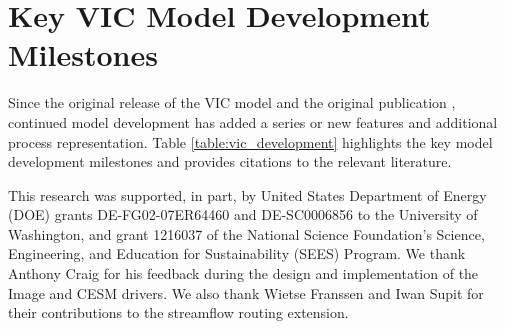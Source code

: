 \documentclass[gmd, manuscript]{copernicus}
\begin{document}
\appendix
\section{Key VIC Model Development Milestones}
\label{appendix:model_development}

Since the original release of the VIC model and the original publication \citet{Liang_1994}, continued model development has added a series or new features and additional process representation. Table \ref{table:vic_development} highlights the key model development milestones and provides citations to the relevant literature.


\begin{acknowledgements}
  This research was supported, in part, by United States Department of Energy (DOE) grants DE-FG02-07ER64460 and DE-SC0006856 to the University of Washington, and grant 1216037 of the National Science Foundation's Science, Engineering, and Education for Sustainability (SEES) Program. We thank Anthony Craig for his feedback during the design and implementation of the Image and CESM drivers. We also thank Wietse Franssen and Iwan Supit for their contributions to the streamflow routing extension.
\end{acknowledgements}




%
%
%





\end{document}
